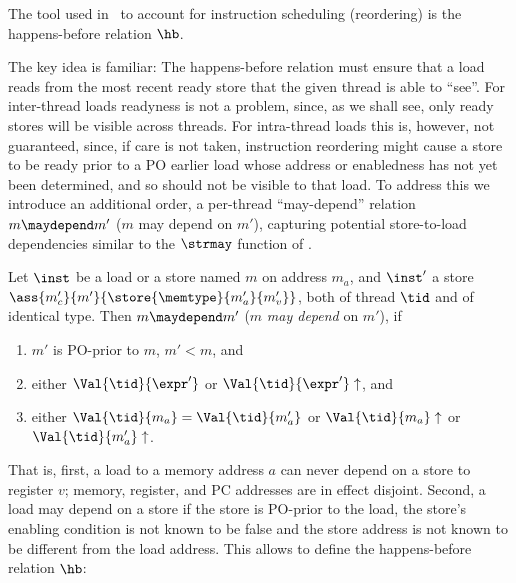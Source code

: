 The tool used in \MCMIL\ to account for instruction scheduling (reordering) is the happens-before relation $\hb$.

The key idea is familiar: The happens-before relation must ensure that a
load reads from the most recent ready store that the given thread is able to ``see''. For inter-thread loads readyness is not a problem, since, as we shall see, only ready stores will be visible across threads. For intra-thread loads this is, however, not guaranteed, since, if care is not taken, instruction reordering might cause a store to be ready prior to a PO earlier load whose address or enabledness has not yet been determined, and so should not be visible to that load. To address this we introduce an additional order, a per-thread ``may-depend'' relation $m\maydepend m'$ ($m$ may depend on $m'$), capturing potential store-to-load dependencies similar to the $\strmay$ function of \cite{MIL}.

\begin{definition}
Let $\inst$ be a load or a store named $m$ on address $m_a$, and $\inst'$ a store $\ass{m_c'}{m'}{\store{\memtype}{m_a'}{m_v'}}$, both of thread $\tid$ and of identical type. Then $m\maydepend m'$ ($m$ \emph{may depend} on $m'$), if
\begin{enumerate}
\item $m'$ is PO-prior to $m$, $m' < m$, and
\item either $\Val{\tid}{\expr'}$ or $\Val{\tid}{\expr'}\uparrow$, and
\item either
$\Val{\tid}{m_a}=\Val{\tid}{m_a'}$ or $\Val{\tid}{m_a}\uparrow$ or $\Val{\tid}{m_a'}\uparrow$.
\end{enumerate}
\end{definition}

That is, first, a load to a memory address $a$ can never depend on a
store to register $v$; memory, register, and PC addresses are in effect
disjoint. Second, a load may depend on a store if the store is PO-prior to the load, the store's enabling condition is not known to be false and the store address is not known to be different from the load address. 
This allows to define the happens-before relation $\hb$:


